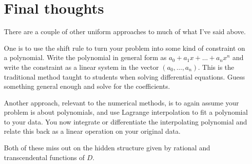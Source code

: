 \documentclass[a4paper]{article}
\theoremstyle{definition}
\begin{document}
\section{Final thoughts}
There are a couple of other uniform approaches to much of what I've said above.

One is to use the shift rule to turn your problem into some kind of constraint on a polynomial.
Write the polynomial in general form as $a_0+a_1x+\ldots+a_nx^n$ and write the constraint as a linear system in the vector $(a_0,\ldots,a_n)$.
This is the traditional method taught to students when solving differential equations.
Guess something general enough and solve for the coefficients.

Another approach, relevant to the numerical methods, is to again assume your problem is about polynomials, and use Lagrange interpolation to fit a polynomial to your data.
You now integrate or differentiate the interpolating polynomial and relate this back as a linear operation on your original data.

Both of these miss out on the hidden structure given by rational and transcendental functions of $D$.



\end{document}
